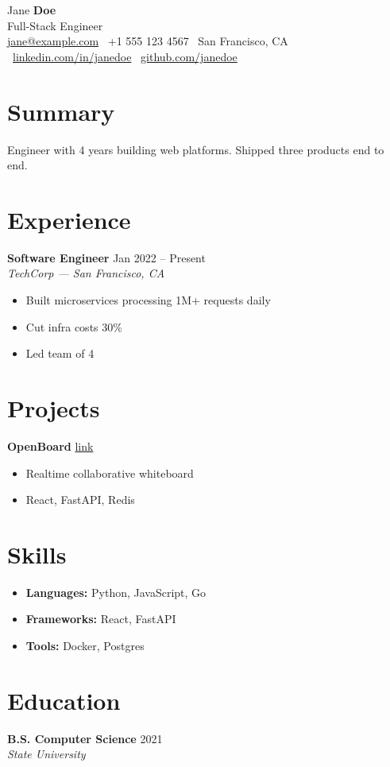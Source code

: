 \documentclass[10pt,a4paper]{article}
\begin{document}
\begin{center}
  {\Huge Jane {\bfseries\color{awesome}Doe}}\\[4pt]
  {\small\color{darktext} Full-Stack Engineer}\\[6pt]
  {\footnotesize
    \href{mailto:jane@example.com}{jane@example.com} \textbar\
    +1 555 123 4567 \textbar\ San Francisco, CA \textbar\
    \href{https://linkedin.com/in/janedoe}{linkedin.com/in/janedoe} \textbar\
    \href{https://github.com/janedoe}{github.com/janedoe}}
\end{center}

\section{Summary}
Engineer with 4 years building web platforms. Shipped three products end to end.

\section{Experience}
\textbf{Software Engineer} \hfill {\color{awesome}\small Jan 2022 -- Present}\\
{\small\itshape TechCorp — San Francisco, CA}
\begin{itemize}[leftmargin=*,nosep,itemsep=2pt]
  \item Built microservices processing 1M+ requests daily
  \item Cut infra costs 30\%
  \item Led team of 4
\end{itemize}

\section{Projects}
\textbf{OpenBoard} \hfill {\color{awesome}\small \href{https://github.com/janedoe/openboard}{link}}
\begin{itemize}[leftmargin=*,nosep,itemsep=2pt]
  \item Realtime collaborative whiteboard
  \item React, FastAPI, Redis
\end{itemize}

\section{Skills}
\begin{itemize}[leftmargin=*,nosep,itemsep=2pt]
  \item \textbf{Languages:} Python, JavaScript, Go
  \item \textbf{Frameworks:} React, FastAPI
  \item \textbf{Tools:} Docker, Postgres
\end{itemize}

\section{Education}
\textbf{B.S. Computer Science} \hfill {\color{awesome}\small 2021}\\
{\small\itshape State University}
\end{document}
